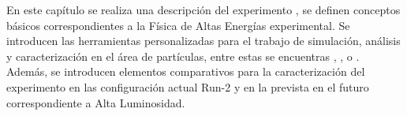 %

En este capítulo se realiza una descripción del experimento \CMS, se definen conceptos básicos correspondientes a la Física de Altas Energías experimental. Se introducen las herramientas personalizadas para el trabajo de simulación, análisis y caracterización en el área de partículas, entre estas se encuentras \ROOT, ,  o . Además, se introducen elementos comparativos para la caracterización del experimento en las configuración actual Run-2 y en la prevista en el futuro correspondiente a Alta Luminosidad.





